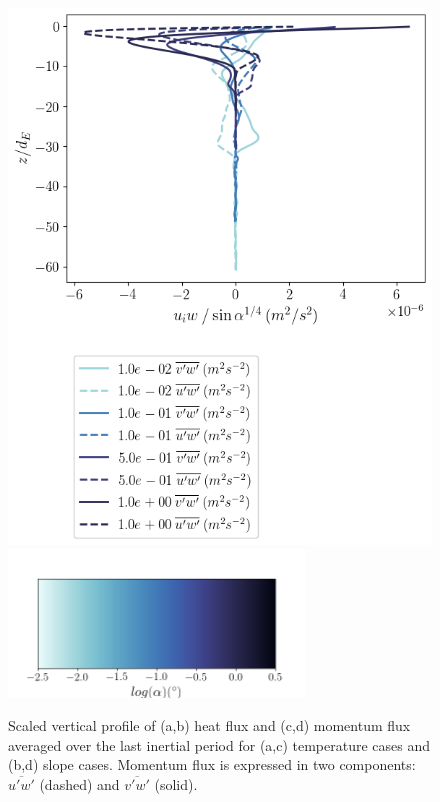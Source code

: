 \begin{figure}
\begin{minipage}{0.5\textwidth}
        \includegraphics[trim={0 7.5cm 0 0},clip,width=\textwidth]{Figures/momflux_cmp_slope_46h_tav13_slopescale_z_profile.png}
        \centering \includegraphics[width=0.7\textwidth,trim={1cm 0cm 1cm 5cm}, clip]{Figures/colorbar_slope.png}
    \end{minipage}
    \caption{Scaled vertical profile of (a,b) heat flux and (c,d) momentum flux averaged over the last inertial period for (a,c) temperature cases and (b,d) slope cases. Momentum flux is expressed in two components:  $\overline{u'w'}$ (dashed) and $\overline{v'w'}$ (solid).} 
    \label{fig:Scaled_flux_profiles}
\end{figure}

